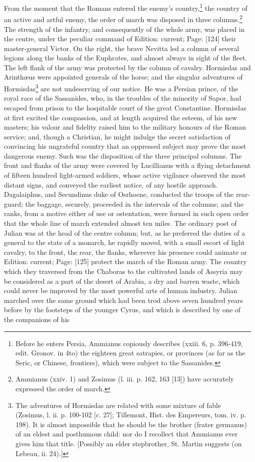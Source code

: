From the moment that the Romans entered the enemy\texthebrew{}’s country,\footnote{Before he enters Persia, Ammianus copiously describes (xxiii. 6, p. 396-419, edit. Gronov. in 4to) the eighteen great satrapies, or provinces (as far as the Seric, or Chinese, frontiers), which were subject to the Sassanides.} the country of an active and artful enemy, the order of march was disposed in three columns.\footnote{Ammianus (xxiv. 1) and Zosimus (l. iii. p. 162, 163 [13]) have accurately expressed the order of march.} The strength of the infantry, and consequently of the whole army, was placed in the centre, under the peculiar command of Edition: current; Page: [124] their master-general Victor. On the right, the brave Nevitta led a column of several legions along the banks of the Euphrates, and almost always in sight of the fleet. The left flank of the army was protected by the column of cavalry. Hormisdas and Arinthæus were appointed generals of the horse; and the singular adventures of Hormisdas\footnote{The adventures of Hormisdas are related with some mixture of fable (Zosimus, l. ii. p. 100-102 [c. 27]; Tillemont, Hist. des Empereurs, tom. iv. p. 198). It is almost impossible that he should be the brother (frater germanus) of an eldest and posthumous child: nor do I recollect that Ammianus ever gives him that title. [Possibly an elder stepbrother, St. Martin suggests (on Lebeau, ii. 24).]} are not undeserving of our notice. He was a Persian prince, of the royal race of the Sassanides, who, in the troubles of the minority of Sapor, had escaped from prison to the hospitable court of the great Constantine. Hormisdas at first excited the compassion, and at length acquired the esteem, of his new masters; his valour and fidelity raised him to the military honours of the Roman service; and, though a Christian, he might indulge the secret satisfaction of convincing his ungrateful country that an oppressed subject may prove the most dangerous enemy. Such was the disposition of the three principal columns. The front and flanks of the army were covered by Lucillianus with a flying detachment of fifteen hundred light-armed soldiers, whose active vigilance observed the most distant signs, and conveyed the earliest notice, of any hostile approach. Dagalaiphus, and Secundinus duke of Osrhoene, conducted the troops of the rear-guard; the baggage, securely, proceeded in the intervals of the columns; and the ranks, from a motive either of use or ostentation, were formed in such open order that the whole line of march extended almost ten miles. The ordinary post of Julian was at the head of the centre column; but, as he preferred the duties of a general to the state of a monarch, he rapidly moved, with a small escort of light cavalry, to the front, the rear, the flanks, wherever his presence could animate or Edition: current; Page: [125] protect the march of the Roman army. The country which they traversed from the Chaboras to the cultivated lands of Assyria may be considered as a part of the desert of Arabia, a dry and barren waste, which could never be improved by the most powerful arts of human industry. Julian marched over the same ground which had been trod above seven hundred years before by the footsteps of the younger Cyrus, and which is described by one of the companions of his 